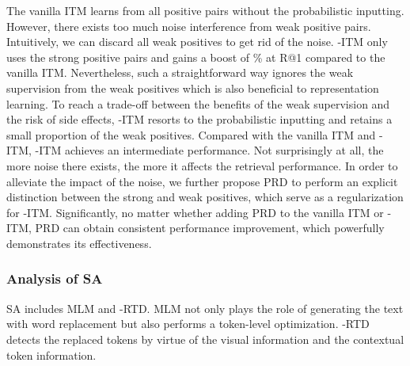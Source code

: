 \documentclass{article}
\begin{document}
The vanilla ITM learns from all positive pairs without the probabilistic inputting.
However, there exists too much noise interference from weak positive pairs.
Intuitively, we can discard all weak positives to get rid of the noise. 
-ITM only uses the strong positive pairs and gains a boost of \% at R@1 compared to the vanilla ITM.
Nevertheless, such a straightforward way ignores the weak supervision from the weak positives which is also beneficial to representation learning. 
To reach a trade-off between the benefits of the weak supervision and the risk of side effects, -ITM resorts to the probabilistic inputting and retains a small proportion of the weak positives.
Compared with the vanilla ITM and -ITM, -ITM achieves an intermediate performance.
Not surprisingly at all, the more noise there exists, the more it affects the retrieval performance.
In order to alleviate the impact of the noise, we further propose PRD to perform an explicit distinction between the strong and weak positives, which serve as a regularization for -ITM.
Significantly, no matter whether adding PRD to the vanilla ITM or -ITM, PRD can obtain consistent performance improvement, which powerfully demonstrates its effectiveness.



\subsubsection{Analysis of SA}
SA includes MLM and -RTD. MLM not only plays the role of generating the text with word replacement but also performs a token-level optimization. -RTD detects the replaced tokens by virtue of the visual information and the contextual token information.
\end{document}
